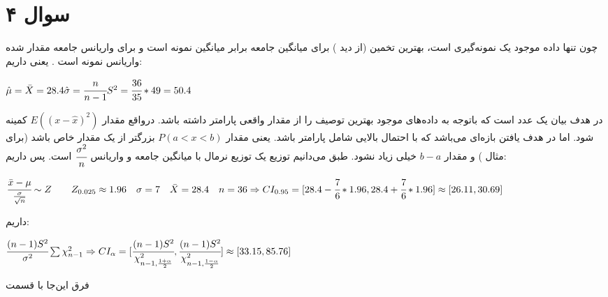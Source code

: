 \documentclass[12pt]{article}
\begin{document}
\section{سوال ۴}
چون تنها داده موجود یک نمونه‌گیری است، بهترین تخمین (از دید ) برای میانگین جامعه برابر میانگین نمونه است و برای واریانس جامعه مقدار 
شده واریانس نمونه است
. یعنی داریم:
\begin{latin}
	$
	\hat{\mu} = \bar{X} = 28.4
	\\
	\hat{\sigma} = \cfrac{n}{n - 1} S^2 = \cfrac{36}{35} * 49  = 50.4
	$
\end{latin}
در 
هدف بیان یک عدد است که باتوجه به داده‌های موجود بهترین توصیف را از مقدار واقعی پارامتر داشته باشد. درواقع مقدار
$
E((x - \hat{x})^2)
$
کمینه شود. اما در 
هدف یافتن بازه‌ای می‌باشد که با احتمال بالایی شامل پارامتر باشد. یعنی مقدار 
$
P(a < x < b)
$
بزرگتر از یک مقدار خاص باشد (برای مثال 
)
و مقدار 
$
b - a$
خیلی زیاد نشود.
طبق  می‌دانیم توزیع 
یک توزیع نرمال با میانگین جامعه و واریانس 
$\cfrac{\sigma^2}{n}$
است. پس
داریم:
\begin{latin}
	$
	\cfrac{\bar{x} - \mu}{\frac{\sigma}{\sqrt{n}}} \sim Z \qquad
	Z_{0.025} \approx 1.96 \quad \sigma = 7 \quad \bar{X} = 28.4 \quad n = 36
	\Rightarrow
	CI_{0.95} = [28.4 - \cfrac{7}{6} * 1.96, 28.4 + \cfrac{7}{6} * 1.96]
	\\
	\approx [26.11, 30.69]
	$
\end{latin}
داریم:
\begin{latin}
	$
	\cfrac{(n - 1)S^2}{\sigma^2} \sum \chi^2_{n - 1}
	\Rightarrow
	CI_{\alpha} = [\cfrac{(n - 1)S^2}{\chi^2_{n - 1, \frac{1 + \alpha}{2}}}, \cfrac{(n - 1)S^2}{\chi^2_{n - 1, \frac{1 - \alpha}{2}}}]
	\approx 
	[33.15, 85.76]
	$
\end{latin}
فرق این‌جا با قسمت 
\end{document}
